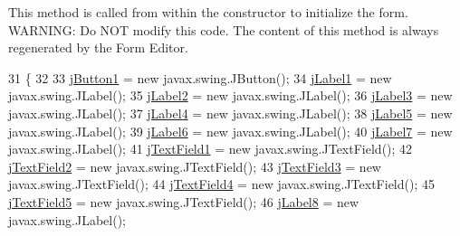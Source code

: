 This method is called from within the constructor to initialize the form. W\+A\+R\+N\+I\+NG\+: Do N\+OT modify this code. The content of this method is always regenerated by the Form Editor. 
\begin{DoxyCode}
31                                   \{
32 
33         \mbox{\hyperlink{class_interfaz_package_1_1_alta_libro_lectura_abd046e1ca910f6419304b648e1e0ecaa}{jButton1}} = \textcolor{keyword}{new} javax.swing.JButton();
34         \mbox{\hyperlink{class_interfaz_package_1_1_alta_libro_lectura_a356654b6ac16de88f1537402ce6b6258}{jLabel1}} = \textcolor{keyword}{new} javax.swing.JLabel();
35         \mbox{\hyperlink{class_interfaz_package_1_1_alta_libro_lectura_adbfcbf3815dc0b6a49f8f73bfb381191}{jLabel2}} = \textcolor{keyword}{new} javax.swing.JLabel();
36         \mbox{\hyperlink{class_interfaz_package_1_1_alta_libro_lectura_a8e3068311cd0998f45b8d16b5df07315}{jLabel3}} = \textcolor{keyword}{new} javax.swing.JLabel();
37         \mbox{\hyperlink{class_interfaz_package_1_1_alta_libro_lectura_a0f93dcf00bc93a61d9fc78c0143d9bdf}{jLabel4}} = \textcolor{keyword}{new} javax.swing.JLabel();
38         \mbox{\hyperlink{class_interfaz_package_1_1_alta_libro_lectura_a022dc8ebc55257499f93b99bddf47167}{jLabel5}} = \textcolor{keyword}{new} javax.swing.JLabel();
39         \mbox{\hyperlink{class_interfaz_package_1_1_alta_libro_lectura_adad4d61512f9ca3dc3fb3276975ac720}{jLabel6}} = \textcolor{keyword}{new} javax.swing.JLabel();
40         \mbox{\hyperlink{class_interfaz_package_1_1_alta_libro_lectura_a35314814f07024c5ef5f0afa592a502f}{jLabel7}} = \textcolor{keyword}{new} javax.swing.JLabel();
41         \mbox{\hyperlink{class_interfaz_package_1_1_alta_libro_lectura_aa23404c288ffab1e9e7e349e4336cc20}{jTextField1}} = \textcolor{keyword}{new} javax.swing.JTextField();
42         \mbox{\hyperlink{class_interfaz_package_1_1_alta_libro_lectura_a27642fe481c01e307cab4843cc5d86b8}{jTextField2}} = \textcolor{keyword}{new} javax.swing.JTextField();
43         \mbox{\hyperlink{class_interfaz_package_1_1_alta_libro_lectura_a51e44050eaeb982b64b831c47c61302f}{jTextField3}} = \textcolor{keyword}{new} javax.swing.JTextField();
44         \mbox{\hyperlink{class_interfaz_package_1_1_alta_libro_lectura_a9270f2ef1de5103cae58610ae6f84a4e}{jTextField4}} = \textcolor{keyword}{new} javax.swing.JTextField();
45         \mbox{\hyperlink{class_interfaz_package_1_1_alta_libro_lectura_a9780c336f84357f6c171a8ccd8f8a94b}{jTextField5}} = \textcolor{keyword}{new} javax.swing.JTextField();
46         \mbox{\hyperlink{class_interfaz_package_1_1_alta_libro_lectura_a04a4898900537bec80bdc4e81d5c41cf}{jLabel8}} = \textcolor{keyword}{new} javax.swing.JLabel();

\end{DoxyCode}
